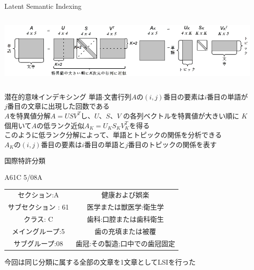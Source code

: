 \documentclass[14pt,xcolor=dvipsnames,table,dvipdfmx]{beamer}
\begin{document}
\begin{frame}{Latent Semantic Indexing}
    \begin{columns}[c]
        \begin{column}{1.0\textwidth} %
            \includegraphics[width=\columnwidth]{photo11.png}
		\end{column}
    \end{columns}
	\begin{block}{潜在的意味インデキシング}
	\fontsize{12pt}{7.2}\selectfont
		単語$\cdot$文書行列$A$の$(i,j)$番目の要素は$i$番目の単語が$j$番目の文章に出現した回数である　\\
		$A$を特異値分解$A = USV^T$し、$U$、$S$、$V$	の各列ベクトルを特異値が大きい順に
		$K$個用いて$A$の低ランク近似$A_K=U_KS_KV_{K}^T$を得る \\
		このように低ランク分解によって、単語とトピックの関係を分析できる \\
		$A_K$の$(i,j)$番目の要素は$i$番目の単語と$j$番目のトピックの関係を表す
	\end{block}
\end{frame}

\begin{frame}{国際特許分類}
	\begin{exampleblock}{\center A61C 5/08A}
	\begin{tabular}{cc}
	セクション:A & 健康および娯楽 \\
 	サブセクション : 61 & 医学または獣医学:衛生学 \\
 	クラス: C & 歯科:口腔または歯科衛生 \\
 	メイングループ:5 & 歯の充填または被覆 \\
 	サブグループ:08 & 歯冠:その製造;口中での歯冠固定 \\
	\end{tabular}
	\end{exampleblock}
	\begin{block}{}
		今回は同じ分類に属する全部の文章を1文章としてLSIを行った
	\end{block}
\end{frame}
\end{document}
